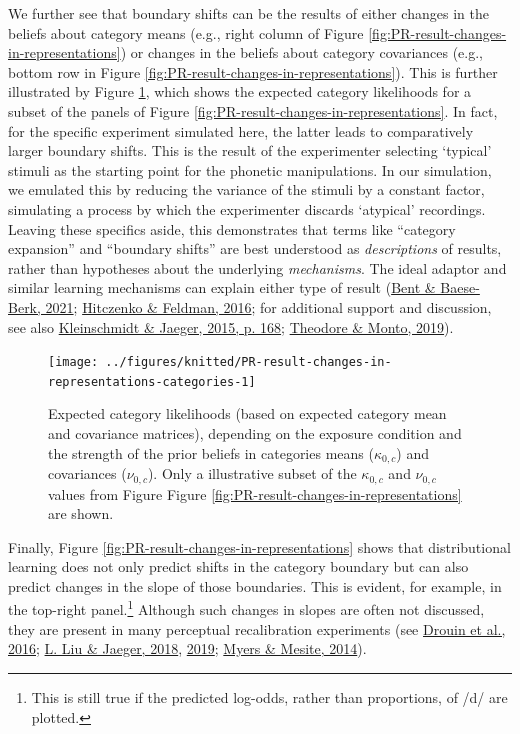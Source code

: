 \documentclass[
  11pt,
  english,
  man,floatsintext]{apa6}
\begin{document}
We further see that boundary shifts can be the results of either changes in the beliefs about category means (e.g., right column of Figure \ref{fig:PR-result-changes-in-representations}) or changes in the beliefs about category covariances (e.g., bottom row in Figure \ref{fig:PR-result-changes-in-representations}). This is further illustrated by Figure \ref{fig:PR-result-changes-in-representations-categories}, which shows the expected category likelihoods for a subset of the panels of Figure \ref{fig:PR-result-changes-in-representations}. In fact, for the specific experiment simulated here, the latter leads to comparatively larger boundary shifts. This is the result of the experimenter selecting `typical' stimuli as the starting point for the phonetic manipulations. In our simulation, we emulated this by reducing the variance of the stimuli by a constant factor, simulating a process by which the experimenter discards `atypical' recordings. Leaving these specifics aside, this demonstrates that terms like ``category expansion'' and ``boundary shifts'' are best understood as \emph{descriptions} of results, rather than hypotheses about the underlying \emph{mechanisms}. The ideal adaptor and similar learning mechanisms can explain either type of result (\protect\hyperlink{ref-bent-baeseberk2021}{Bent \& Baese-Berk, 2021}; \protect\hyperlink{ref-hitczenko-feldman2016}{Hitczenko \& Feldman, 2016}; for additional support and discussion, see also \protect\hyperlink{ref-kleinschmidt-jaeger2015}{Kleinschmidt \& Jaeger, 2015, p. 168}; \protect\hyperlink{ref-theodore-monto2019}{Theodore \& Monto, 2019}).



\begin{figure}

{\centering \texttt{[image: ../figures/knitted/PR-result-changes-in-representations-categories-1]} 

}

\caption{Expected category likelihoods (based on expected category mean and covariance matrices), depending on the exposure condition and the strength of the prior beliefs in categories means (\(\kappa_{0,c}\)) and covariances (\(\nu_{0,c}\)). Only a illustrative subset of the \(\kappa_{0,c}\) and \(\nu_{0,c}\) values from Figure Figure \ref{fig:PR-result-changes-in-representations} are shown.}\label{fig:PR-result-changes-in-representations-categories}
\end{figure}

Finally, Figure \ref{fig:PR-result-changes-in-representations} shows that distributional learning does not only predict shifts in the category boundary but can also predict changes in the slope of those boundaries. This is evident, for example, in the top-right panel.\footnote{This is still true if the predicted log-odds, rather than proportions, of /d/ are plotted.} Although such changes in slopes are often not discussed, they are present in many perceptual recalibration experiments (see \protect\hyperlink{ref-drouin2016}{Drouin et al., 2016}; \protect\hyperlink{ref-liu-jaeger2018}{L. Liu \& Jaeger, 2018}, \protect\hyperlink{ref-liu-jaeger2019}{2019}; \protect\hyperlink{ref-myers-mesite2014}{Myers \& Mesite, 2014}).
\end{document}
